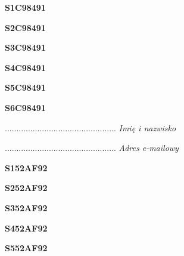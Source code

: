 \begin{turn}{90}\huge \textbf{S1C98491}\end{turn}

\begin{turn}{90}\huge \textbf{S2C98491}\end{turn}

\begin{turn}{90}\huge \textbf{S3C98491}\end{turn}

\begin{turn}{90}\huge \textbf{S4C98491}\end{turn}

\begin{turn}{90}\huge \textbf{S5C98491}\end{turn}

\begin{turn}{90}\huge \textbf{S6C98491}\end{turn}

\begin{turn}{90}\begin{minipage}{\linewidth} \vspace{20mm} ................................................  \textit{Imię i nazwisko}\end{minipage}\end{turn}

\begin{turn}{90}\begin{minipage}{\linewidth} \vspace{20mm} ................................................  \textit{Adres e-mailowy}\end{minipage}\end{turn}

\begin{turn}{90}\huge \textbf{S152AF92}\end{turn}

\begin{turn}{90}\huge \textbf{S252AF92}\end{turn}

\begin{turn}{90}\huge \textbf{S352AF92}\end{turn}

\begin{turn}{90}\huge \textbf{S452AF92}\end{turn}

\begin{turn}{90}\huge \textbf{S552AF92}\end{turn}

